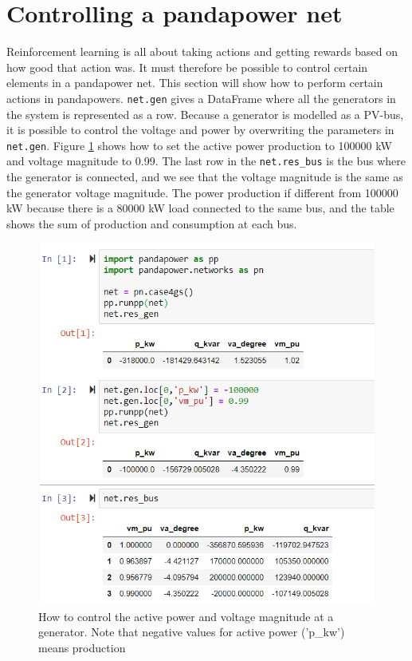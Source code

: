 \documentclass[class=book, crop=false]{standalone}
\begin{document}
\section{Controlling a pandapower net}
Reinforcement learning is all about taking actions and getting rewards based on how good that action was. It must therefore be possible to control certain elements in a pandapower net. This section will show how to perform certain actions in pandapowers. \texttt{net.gen} gives a DataFrame where all the generators in the system is represented as a row. Because a generator is modelled as a PV-bus, it is possible to control the voltage and power by overwriting the parameters in \texttt{net.gen}. Figure \ref{fig:method:case4g_controll_vm_p_kw} shows how to set the active power production to 100000 kW and voltage magnitude to 0.99. The last row in the \texttt{net.res\_bus} is the bus where the generator is connected, and we see that the voltage magnitude is the same as the generator voltage magnitude. The power production if different from 100000 kW because there is a 80000 kW load connected to the same bus, and the table shows the sum of production and consumption at each bus. 



\begin{figure}[H]
    \center
    \includegraphics[height=12cm, width=12cm]{figures/case4g_controll_vm_p_kw.PNG}
    \caption[size = 9]{How to control the active power and voltage magnitude at a generator. Note that negative values for active power ('p\_kw') means production}
    \label{fig:method:case4g_controll_vm_p_kw}
\end{figure}
\end{document}
